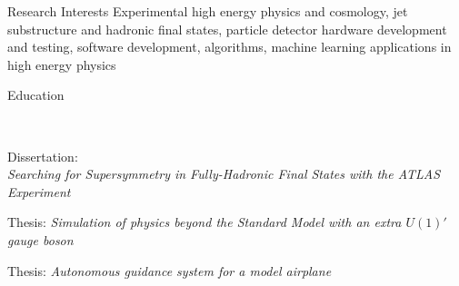 \documentclass{resume}
\begin{document}

\begin{rsection}{Research Interests}
  Experimental high energy physics and cosmology, jet substructure and hadronic final states, particle detector hardware development and testing, software development, algorithms, machine learning applications in high energy physics
\end{rsection}


\begin{rsection}{Education}

  \\
  \vspace{-0.2em}
  \item Dissertation: \\{\em Searching for Supersymmetry in Fully-Hadronic Final States with the ATLAS Experiment}


  \vspace{-0.2em}
  \item Thesis: {\em Simulation of physics beyond the Standard Model with an extra $U(1)'$ gauge boson}




  \vspace{-0.2em}
  \item Thesis: {\em Autonomous guidance system for a model airplane}

\end{rsection}
\end{document}
